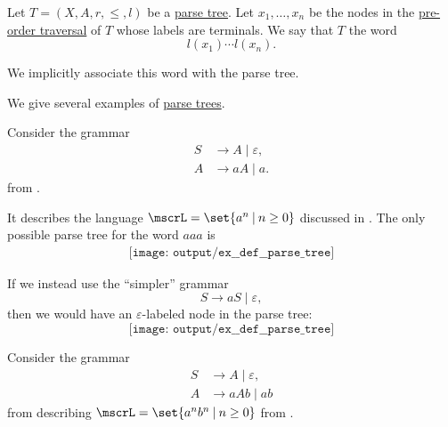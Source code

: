 \begin{definition}\label{def:parse_tree_word}
  Let \( T = (X, A, r, \leq, l) \) be a \hyperref[def:parse_tree]{parse tree}. Let \( x_1, \ldots, x_n \) be the nodes in the \hyperref[def:traversal_ordering]{pre-order traversal} of \( T \) whose labels are terminals. We say that \( T \)  the word
  \begin{equation*}
    l(x_1) \cdots l(x_n).
  \end{equation*}

  We implicitly associate this word with the parse tree.
\end{definition}

\begin{example}\label{ex:def:parse_tree}
  We give several examples of \hyperref[def:parse_tree]{parse trees}.

  \begin{thmenum}
     Consider the grammar
    \begin{equation*}
      \begin{aligned}
        S &\to A \mid \varepsilon, \\
        A &\to aA \mid a.
      \end{aligned}
    \end{equation*}
    from .

    It describes the language \( \mscrL = \set{ a^n \given n \geq 0 } \) discussed in . The only possible parse tree for the word \( aaa \) is
    \begin{equation*}\label{eq:ex:def:parse_tree/an}
      \begin{aligned}
        \texttt{[image: output/ex\_\_def\_\_parse\_tree]}
      \end{aligned}
    \end{equation*}

    If we instead use the \enquote{simpler} grammar
    \begin{equation*}
      S \to aS \mid \varepsilon,
    \end{equation*}
    then we would have an \( \varepsilon \)-labeled node in the parse tree:
    \begin{equation*}
      \texttt{[image: output/ex\_\_def\_\_parse\_tree]}
    \end{equation*}

     Consider the grammar
    \begin{equation*}
      \begin{aligned}
        S &\to A \mid \varepsilon, \\
        A &\to aAb \mid ab
      \end{aligned}
    \end{equation*}
    from  describing \( \mscrL = \set{ a^n b^n \given n \geq 0 } \) from .


\end{thmenum}
\end{example}
